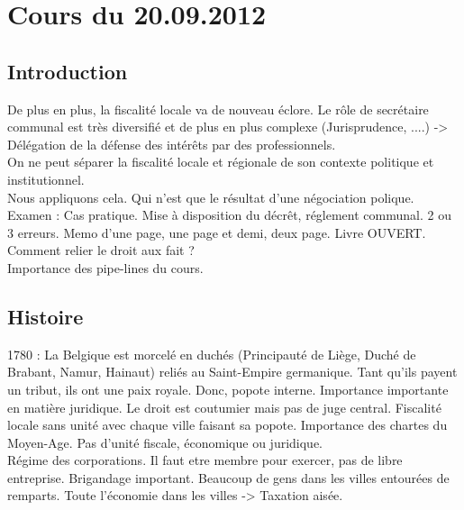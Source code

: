 \documentclass{book}
\begin{document}
\thispagestyle{empty}
\setcounter{page}{0}
\null
\newpage
{} \setcounter{page}{1} 




\tableofcontents



\chapter{Cours du 20.09.2012}
 \setcounter{page}{1} 

\section{Introduction}

De plus en plus, la fiscalité locale va de nouveau éclore. Le rôle de secrétaire communal est très diversifié et  de plus en plus complexe (Jurisprudence, ....) -> Délégation de la défense des intérêts par des professionnels.\\

On ne peut séparer la fiscalité locale et régionale de son contexte politique et institutionnel.\\

Nous appliquons cela. Qui n'est que le résultat d'une négociation polique.\\

Examen : Cas pratique. Mise à disposition du décrêt, réglement communal. 2 ou 3 erreurs. Memo d'une page, une page et demi, deux page. Livre OUVERT. Comment relier le droit aux fait ?\\

Importance des pipe-lines du cours.\\

\section{Histoire} 

1780 : La Belgique est morcelé en duchés (Principauté de Liège, Duché de Brabant, Namur, Hainaut) reliés au Saint-Empire germanique. Tant qu'ils payent un tribut, ils ont une paix royale. Donc, popote interne. Importance importante en matière juridique. Le droit est coutumier mais pas de juge central. Fiscalité locale sans unité avec chaque ville faisant sa popote. Importance des chartes du Moyen-Age. Pas d'unité fiscale, économique  ou juridique.\\

Régime des corporations. Il faut etre membre pour exercer, pas de libre entreprise. Brigandage important. Beaucoup de gens dans les villes entourées de remparts. Toute l'économie dans les villes -> Taxation aisée.\\
\end{document}
